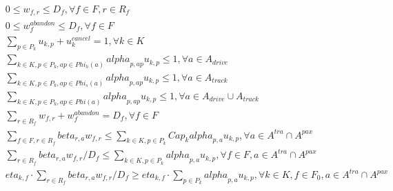 \begin{align}
  & 0 \leq w_{f , r} \leq D_{f} , \forall f \in F , r \in R_{f} \tag{eq\_0003} \\
  & 0 \leq w_{f}^{\mathit{abandon}} \leq D_{f} , \forall f \in F \tag{eq\_0004} \\
  & \sum_{p \in P_{k}} u_{k , p} + u_{k}^{\mathit{cancel}} = 1 , \forall k \in K \tag{eq\_0005} \\
  & \sum_{k \in K, p \in P_{k}, ap \in \mathit{Phi}_{h} \left(a\right)} \mathit{alpha}_{p , ap} u_{k , p} \leq 1 , \forall a \in A_{\mathit{drive}} \tag{eq\_0007} \\
  & \sum_{k \in K, p \in P_{k}, ap \in \mathit{Phi}_{s} \left(a\right)} \mathit{alpha}_{p , ap} u_{k , p} \leq 1 , \forall a \in A_{\mathit{track}} \tag{eq\_0009} \\
  & \sum_{k \in K, p \in P_{k}, ap \in \mathit{Phi} \left(a\right)} \mathit{alpha}_{p , ap} u_{k , p} \leq 1 , \forall a \in A_{\mathit{drive}} \cup A_{\mathit{track}} \tag{eq\_0011} \\
  & \sum_{r \in R_{f}} w_{f , r} + w_{f}^{\mathit{abandon}} = D_{f} , \forall f \in F \tag{eq\_0012} \\
  & \sum_{f \in F, r \in R_{f}} \mathit{beta}_{r , a} w_{f , r} \leq \sum_{k \in K, p \in P_{k}} \mathit{Ca} p_{k} \mathit{alpha}_{p , a} u_{k , p} , \forall a \in A^{\mathit{tra}} \cap A^{\mathit{pax}} \tag{eq\_0013} \\
  & \sum_{r \in R_{f}} \mathit{beta}_{r , a} w_{f , r} / D_{f} \leq \sum_{k \in K, p \in P_{k}} \mathit{alpha}_{p , a} u_{k , p} , \forall f \in F , a \in A^{\mathit{tra}} \cap A^{\mathit{pax}} \tag{eq\_0014} \\
  & \mathit{eta}_{k , f} \cdot \sum_{r \in R_{f}} \mathit{beta}_{r , a} w_{f , r} / D_{f} \geq \mathit{eta}_{k , f} \cdot \sum_{p \in P_{k}} \mathit{alpha}_{p , a} u_{k , p} , \forall k \in K , f \in F_{0} , a \in A^{\mathit{tra}} \cap A^{\mathit{pax}} \tag{eq\_0015} \\

\end{align}
